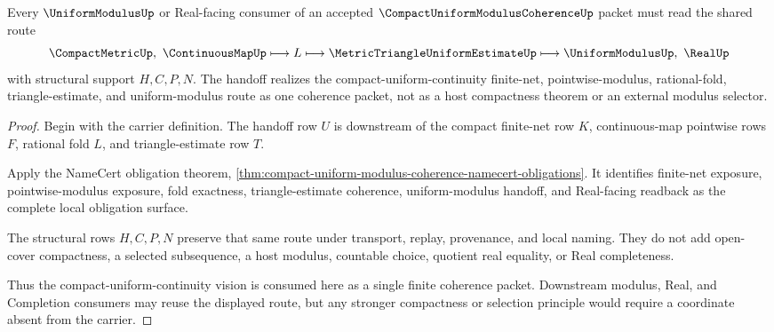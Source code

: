 \begin{theorem}
\label{thm:compact-uniform-modulus-coherence-vision-handoff}
Every $\UniformModulusUp$ or Real-facing consumer of an accepted $\CompactUniformModulusCoherenceUp$ packet must read the shared route
$$
\CompactMetricUp,\ \ContinuousMapUp \longmapsto L \longmapsto \MetricTriangleUniformEstimateUp \longmapsto \UniformModulusUp,\ \RealUp
$$
with structural support $H,C,P,N$. The handoff realizes the compact-uniform-continuity finite-net, pointwise-modulus, rational-fold, triangle-estimate, and uniform-modulus route as one coherence packet, not as a host compactness theorem or an external modulus selector.
\end{theorem}
\begin{proof}
Begin with the carrier definition. The handoff row $U$ is downstream of the compact finite-net row $K$, continuous-map pointwise rows $F$, rational fold $L$, and triangle-estimate row $T$.

Apply the NameCert obligation theorem, \autoref{thm:compact-uniform-modulus-coherence-namecert-obligations}. It identifies finite-net exposure, pointwise-modulus exposure, fold exactness, triangle-estimate coherence, uniform-modulus handoff, and Real-facing readback as the complete local obligation surface.

The structural rows $H,C,P,N$ preserve that same route under transport, replay, provenance, and local naming. They do not add open-cover compactness, a selected subsequence, a host modulus, countable choice, quotient real equality, or Real completeness.

Thus the compact-uniform-continuity vision is consumed here as a single finite coherence packet. Downstream modulus, Real, and Completion consumers may reuse the displayed route, but any stronger compactness or selection principle would require a coordinate absent from the carrier.
\end{proof}



